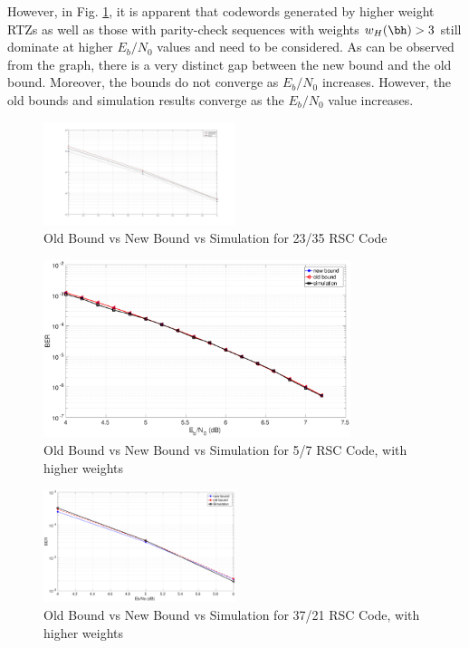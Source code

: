 However, in Fig. \ref{simFig3}, it is apparent that codewords generated by higher weight RTZs as well as those with parity-check sequences with weights $w_H(\bh)>3$ still dominate at higher $E_b/N_0$ values and need to be considered. As can be observed from the graph, there is a very distinct gap between the new bound and the old bound. Moreover, the bounds do not converge as $E_b/N_0$ increases. However, the old bounds and simulation results converge as the $E_b/N_0$ value increases. 

\begin{figure}[h!]
\centering
		\includegraphics[width=0.5\textwidth]{./Images/RSC_23_35_v3.jpg}
		\caption{Old Bound vs New Bound vs Simulation for 23/35 RSC Code}
		\label{simFig3}
		\end{figure}
		

\begin{figure}[h!]
\centering
		\includegraphics[width=0.8\textwidth]{./Images/RSC_5_7_higher_weights.eps}
		\caption{Old Bound vs New Bound vs Simulation for 5/7 RSC Code, with higher weights }
		\label{simFig4}
		\end{figure}
		
		
		\begin{figure}[h!]
\centering
		\includegraphics[width=0.5\textwidth]{./Images/RSC_37_21_v2.eps}
		\caption{Old Bound vs New Bound vs Simulation for 37/21 RSC Code, with higher weights}
		\label{simFig5}
		\end{figure}


